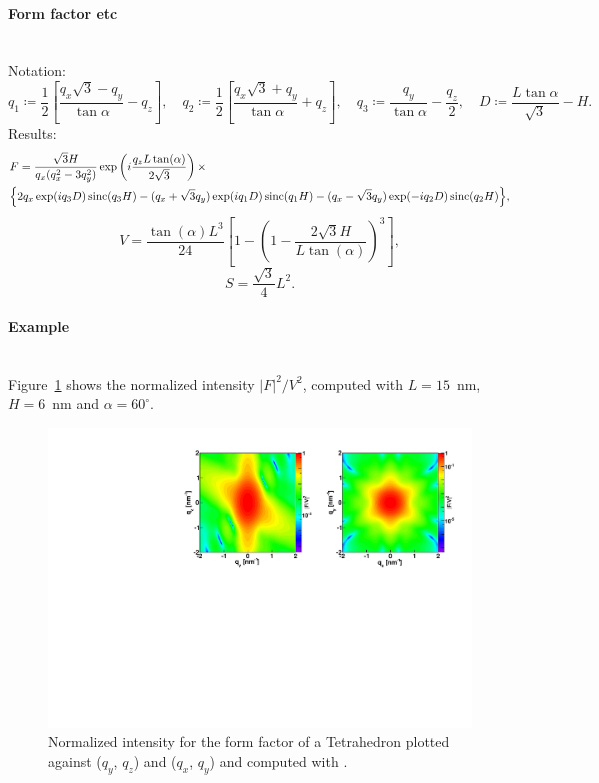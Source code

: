 \paragraph{Form factor etc}\strut\\
Notation:
\begin{equation*}
q_1  \coloneqq \frac{1}{2}\left[\frac{q_x\sqrt{3} -q_y}{\tan \alpha}-q_z \right],
\quad q_2 \coloneqq \frac{1}{2}\left[\frac{q_x\sqrt{3} +q_y}{\tan \alpha}+q_z
\right], \quad 
q_3 \coloneqq \frac{q_y}{\tan \alpha} -\frac{q_z}{2}, \quad 
D \coloneqq \frac{L \tan \alpha}{\sqrt{3}} -H.
\end{equation*}
Results:
\begin{align*}
&F=\frac{\sqrt{3}H}{q_x (q_x^2-3q_y^2)}
\exp\left(i\frac{q_z L\tan (\alpha)}{2\sqrt{3}}\right) \times \\
&\Big\{2q_x \exp(iq_3 D)\operatorname{sinc}(q_3 H) - (q_x +\sqrt{3}q_y)
\exp(iq_1 D)\operatorname{sinc}(q_1 H) -(q_x-\sqrt{3}q_y)\exp(-iq_2
D)\operatorname{sinc}(q_2 H) \Big\}, 
\end{align*}
\begin{equation*}
  V= \dfrac{\tan(\alpha) L^3}{24} \left[1- \left(1 -
  \dfrac{2\sqrt{3} H}{L \tan(\alpha)} \right)^3\right],
\end{equation*}
\begin{equation*}
  S =\dfrac{\sqrt{3}}{4}L^2.
\end{equation*}

\paragraph{Example}\strut\\
Figure~\ref{fig:FFtetrahEx} shows the normalized intensity
$|F|^2/V^2$, computed with $L=15$~nm, $H=6$~nm and $\alpha =60
^{\circ}$.

\begin{figure}[h]
\begin{center}
\includegraphics[angle=-90,width=\textwidth]{fig/ff/figfftetrahedron.pdf}
\end{center}
\caption{Normalized intensity for the form factor of a Tetrahedron
  plotted against ($q_y$, $q_z$) and  ($q_x$, $q_y$) and
  computed with .}
\label{fig:FFtetrahEx}
\end{figure}

